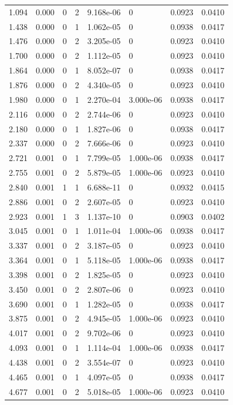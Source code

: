 \documentclass[preview]{standalone}
\begin{document}
{{\begin{tabular}{L{1.2cm}C{1.2cm} C{0.3cm}C{0.5cm} C{1.4cm}C{1.4cm} C{1.4cm}C{1.4cm}}
  1.094  &  0.000  & 0     &  2 &  9.168e-06  & 0  & 0.0923 &  0.0410   \\ 
  1.438  &  0.000  & 0     &  1 &  1.062e-05  & 0  & 0.0938 &  0.0417   \\ 
  1.476  &  0.000  & 0     &  2 &  3.205e-05  & 0  & 0.0923 &  0.0410   \\ 
  1.700  &  0.000  & 0     &  2 &  1.112e-05  & 0  & 0.0923 &  0.0410   \\ 
  1.864  &  0.000  & 0     &  1 &  8.052e-07  & 0  & 0.0938 &  0.0417   \\ 
  1.876  &  0.000  & 0     &  2 &  4.340e-05  & 0  & 0.0923 &  0.0410   \\ 
  1.980  &  0.000  & 0     &  1 &  2.270e-04  & 3.000e-06  & 0.0938 &  0.0417   \\ 
  2.116  &  0.000  & 0     &  2 &  2.744e-06  & 0  & 0.0923 &  0.0410   \\ 
  2.180  &  0.000  & 0     &  1 &  1.827e-06  & 0  & 0.0938 &  0.0417   \\ 
  2.337  &  0.000  & 0     &  2 &  7.666e-06  & 0  & 0.0923 &  0.0410   \\ 
  2.721  &  0.001  & 0     &  1 &  7.799e-05  & 1.000e-06  & 0.0938 &  0.0417   \\ 
  2.755  &  0.001  & 0     &  2 &  5.879e-05  & 1.000e-06  & 0.0923 &  0.0410   \\ 
  2.840  &  0.001  & 1     &  1 &  6.688e-11  & 0  & 0.0932 &  0.0415   \\ 
  2.886  &  0.001  & 0     &  2 &  2.607e-05  & 0  & 0.0923 &  0.0410   \\ 
  2.923  &  0.001  & 1     &  3 &  1.137e-10  & 0  & 0.0903 &  0.0402   \\ 
  3.045  &  0.001  & 0     &  1 &  1.011e-04  & 1.000e-06  & 0.0938 &  0.0417   \\ 
  3.337  &  0.001  & 0     &  2 &  3.187e-05  & 0  & 0.0923 &  0.0410   \\ 
  3.364  &  0.001  & 0     &  1 &  5.118e-05  & 1.000e-06  & 0.0938 &  0.0417   \\ 
  3.398  &  0.001  & 0     &  2 &  1.825e-05  & 0  & 0.0923 &  0.0410   \\ 
  3.450  &  0.001  & 0     &  2 &  2.807e-06  & 0  & 0.0923 &  0.0410   \\ 
  3.690  &  0.001  & 0     &  1 &  1.282e-05  & 0  & 0.0938 &  0.0417   \\ 
  3.875  &  0.001  & 0     &  2 &  4.945e-05  & 1.000e-06  & 0.0923 &  0.0410   \\ 
  4.017  &  0.001  & 0     &  2 &  9.702e-06  & 0  & 0.0923 &  0.0410   \\ 
  4.093  &  0.001  & 0     &  1 &  1.114e-04  & 1.000e-06  & 0.0938 &  0.0417   \\ 
  4.438  &  0.001  & 0     &  2 &  3.554e-07  & 0  & 0.0923 &  0.0410   \\ 
  4.465  &  0.001  & 0     &  1 &  4.097e-05  & 0  & 0.0938 &  0.0417   \\ 
  4.677  &  0.001  & 0     &  2 &  5.018e-05  & 1.000e-06  & 0.0923 &  0.0410   \\ 
\hline 
\end{tabular} 

}}
\end{document}
